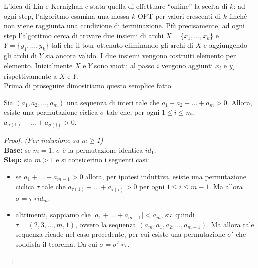 L'idea di Lin e Kernighan è stata quella di effettuare ``online'' la scelta di $k$: ad ogni step, 
l'algoritmo esamina una mossa $k$-OPT per valori crescenti di $k$ finché non viene raggiunta una condizione 
di terminazione. Più precisamente, ad ogni step l'algoritmo cerca di trovare due insiemi di archi 
$X = \{x_1,\dots,x_k\}$ e $Y = \{y_1,\dots,y_k\}$ tali che il tour ottenuto eliminando gli archi 
di $X$ e aggiungendo gli archi di $Y$ sia ancora valido. I due insiemi vengono costruiti elemento per elemento.
Inizialmente $X$ e $Y$ sono vuoti; al passo $i$ vengono aggiunti $x_i$ e $y_i$ rispettivamente a $X$ e $Y$.
\ \\

Prima di proseguire dimostriamo questo semplice fatto:
\begin{theorem}
    Sia $(a_1, a_2, \dots, a_m)$ una sequenza di interi tale che $a_1+a_2+\dots+a_m > 0$. Allora, esiste
    una permutazione ciclica $\sigma$ tale che, per ogni $1\leq{}i\leq{}m$, $a_{\sigma(1)}+\dots+a_{\sigma(i)} > 0$.
\end{theorem}

\begin{proof}{\textit{(Per induzione su $m\ge$1)}}\\
    \textbf{Base:} se $m=1$, $\sigma$ è la permutazione identica $id_1$.\\
    \textbf{Step:} sia $m>1$ e si considerino i seguenti casi:
    \begin{itemize}
        \item se $a_1+\dots+a_{m-1}>0$ allora, per ipotesi induttiva, esiste una
                permutazione ciclica $\tau$ tale che $a_{\tau(1)}+\dots+a_{\tau(i)} > 0$ per
                ogni $1\leq{}i\leq{m-1}$. Ma allora $\sigma = \tau{}\circ{}id_m$.

        \item altrimenti, sappiamo che $|a_1+\dots+a_{m-1}| < a_m$, sia quindi $\tau=(2,3,\dots,m,1)$, ovvero
                la sequenza $(a_m,a_1,a_2,\dots,a_{m-1})$. Ma allora tale sequenza ricade nel caso precedente,
                per cui esiste una permutazione $\sigma'$ che soddisfa il teorema. Da cui $\sigma=\sigma'\circ\tau$.
    \end{itemize}
\end{proof}
\ \\

